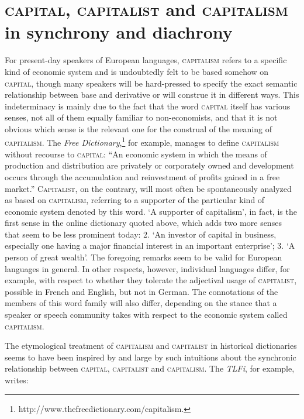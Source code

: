 \documentclass[output=paper]{langsci/langscibook}
\begin{document}
\section{\textsc{capital}, \textsc{capitalist} and \textsc{capitalism} in
synchrony and diachrony}

For present-day speakers of European languages, \textsc{capitalism}
refers to a specific kind of economic system and is undoubtedly felt to
be based somehow on \textsc{capital}, though many speakers will be
hard-pressed to specify the exact semantic relationship between base and
derivative or will construe it in different ways. This indeterminacy is
mainly due to the fact that the word \textsc{capital} itself has various
senses, not all of them equally familiar to non-economists, and that it
is not obvious which sense is the relevant one for the construal of the
meaning of \textsc{capitalism}. The \emph{Free
Dictionary},\footnote{http://www.thefreedictionary.com/capitalism.}
for example, manages to define \textsc{capitalism} without recourse to
\textsc{capital}: ``An economic system in which the means of production
and distribution are privately or corporately owned and development
occurs through the accumulation and reinvestment of profits gained in a
free market.'' \textsc{Capitalist}, on the contrary, will most often be
spontaneously analyzed as based on \textsc{capitalism}, referring to a
supporter of the particular kind of economic system denoted by this
word. `A supporter of capitalism', in fact, is the first sense in the
online dictionary quoted above, which adds two more senses that seem to
be less prominent today: 2. `An investor of capital in business,
especially one having a major financial interest in an important
enterprise'; 3. `A person of great wealth'. The foregoing remarks seem
to be valid for European languages in general. In other respects,
however, individual languages differ, for example, with respect to
whether they tolerate the adjectival usage of \textsc{capitalist},
possible in French and English, but not in German. The connotations of
the members of this word family will also differ, depending
on the stance that a speaker or speech community takes with respect to
the economic system called \textsc{capitalism}.

The etymological treatment of \textsc{capitalism} and
\textsc{capitalist} in historical dictionaries seems to have been
inspired by and large by such intuitions about the synchronic
relationship between \textsc{capital}, \textsc{capitalist} and
\textsc{capitalism}. The \emph{TLFi}, for example, writes:
\end{document}
